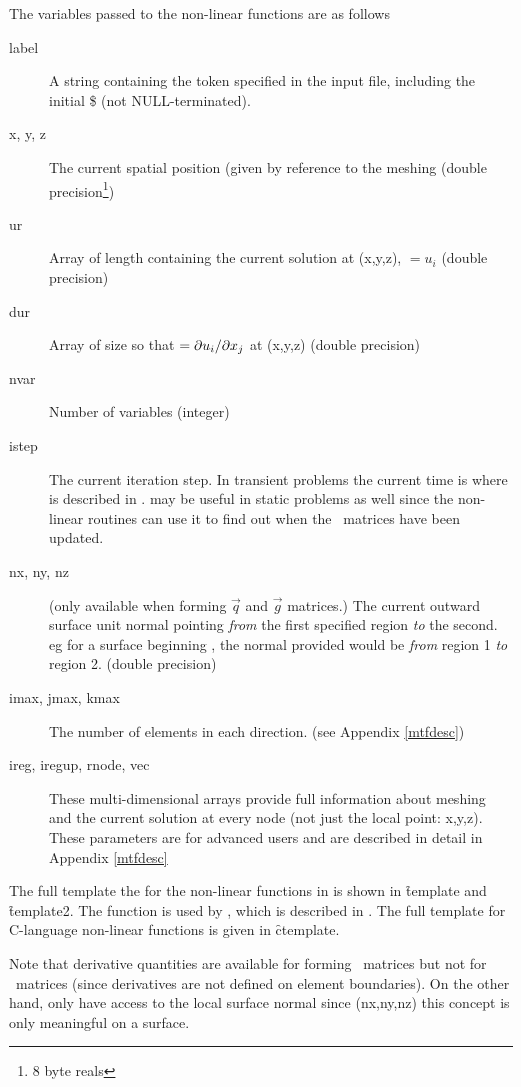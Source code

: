 \documentclass[a4paper,twoside,11pt]{book}
\begin{document}
The variables passed to the non-linear functions are as follows
\begin{description}
  \item[label] A string containing the token specified in the input
    file, including the initial \$ (not NULL-terminated).
  \item[x, y, z] The current spatial position (given by reference to the
    meshing (double precision\footnote{8 byte reals})
  \item[ur] Array of length  containing the current solution
    at (x,y,z), $=u_i$ (double precision)
  \item[dur] Array of size  so that
    $=\partial u_i/\partial x_j$ at (x,y,z) (double precision)
  \item[nvar] Number of variables (integer)
  \item[istep] The current iteration step. In transient problems the
    current time is  where  is described
    in .  may be useful in static problems as
    well since the non-linear routines can use it to find out when the
    \zinc\ matrices have been updated.
  \item[nx, ny, nz] (only available when forming $\vec q$ and $\vec g$
    matrices.) The current outward surface unit normal pointing \emph{from}
    the first specified region \emph{to} the second. eg for a surface
    beginning , the normal provided would
    be \emph{from} region 1 \emph{to} region 2.  (double precision)
  \item[imax, jmax, kmax] The number of elements in each direction. (see
    Appendix \ref{mtfdesc})
  \item[ireg, iregup, rnode, vec] These multi-dimensional arrays
    provide full information about meshing and the current solution at
    every node (not just the local point: x,y,z). These parameters are for advanced users and are
    described in detail in Appendix \ref{mtfdesc}
\end{description}

The full template the for the non-linear functions in 
is shown in \f{template} and \f{template2}. The function 
is used by \zpp, which is described in . The full
template for C-language non-linear functions is given in
\f{ctemplate}.

Note that derivative quantities are available for forming
\caf\ matrices but not for \qg\ matrices (since derivatives are not
defined on element boundaries). On the other hand, only  have access to the local surface normal since (nx,ny,nz) this
concept is only meaningful on a surface.
\end{document}
